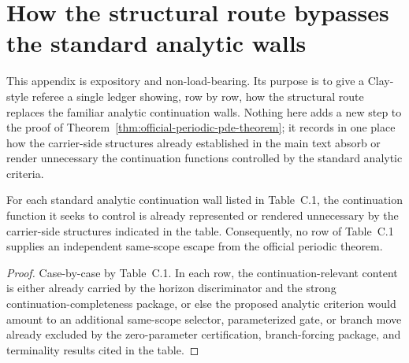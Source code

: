 \clearpage
\section{How the structural route bypasses the standard analytic walls}

This appendix is expository and non-load-bearing. Its purpose is to give a Clay-style referee a
single ledger showing, row by row, how the structural route replaces the familiar analytic continuation
walls. Nothing here adds a new step to the proof of Theorem~\ref{thm:official-periodic-pde-theorem};
it records in one place how the carrier-side structures already established in the main text absorb or
render unnecessary the continuation functions controlled by the standard analytic criteria.

\begin{manualproposition}
For each standard analytic continuation wall listed in Table~C.1, the continuation function it seeks
to control is already represented or rendered unnecessary by the carrier-side structures indicated in
the table. Consequently, no row of Table~C.1 supplies an independent same-scope escape from the
official periodic theorem.
\end{manualproposition}

\begin{proof}
Case-by-case by Table~C.1. In each row, the continuation-relevant content is either already carried by
the horizon discriminator and the strong continuation-completeness package, or else the proposed
analytic criterion would amount to an additional same-scope selector, parameterized gate, or branch
move already excluded by the zero-parameter certification, branch-forcing package, and terminality
results cited in the table.
\end{proof}

